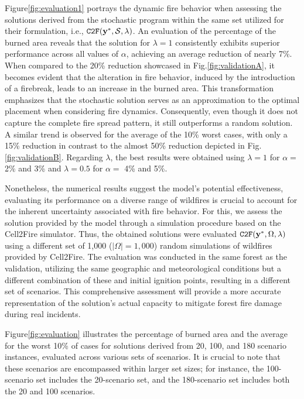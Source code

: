 \documentclass[a4paper,fleqn]{cas-sc}
\begin{document}
Figure\:\ref{fig:evaluation1} portrays the dynamic fire behavior when assessing the solutions derived from the stochastic program within the same set utilized for their formulation, i.e., $\texttt{C2F}(\vb{y}^*, \mathcal{S}, \lambda)$. An evaluation of the percentage of the burned area reveals that the solution for $\lambda = 1$ consistently exhibits superior performance across all values of $\alpha$, achieving an average reduction of nearly 7\%. When compared to the 20\% reduction showcased in Fig.\:\ref{fig:validationA}, it becomes evident that the alteration in fire behavior, induced by the introduction of a firebreak, leads to an increase in the burned area. This transformation emphasizes that the stochastic solution serves as an approximation to the optimal placement when considering fire dynamics. Consequently, even though it does not capture the complete fire spread pattern, it still outperforms a random solution. A similar trend is observed for the average of the 10\% worst cases, with only a 15\% reduction in contrast to the almost 50\% reduction depicted in Fig.\:\ref{fig:validationB}. Regarding $\lambda$, the best results were obtained using $\lambda = 1$ for $\alpha = $2\% and 3\% and $\lambda = 0.5$ for $\alpha =$ 4\% and 5\%.

Nonetheless, the numerical results suggest the model's potential effectiveness, evaluating its performance on a diverse range of wildfires is crucial to account for the inherent uncertainty associated with fire behavior. For this, we assess the solution provided by the model through a simulation procedure based on the Cell2Fire simulator. Thus, the obtained solutions were evaluated $\texttt{C2F}(\vb{y}^*, \Omega, \lambda)$ using a different set of 1,000 ($\vert \Omega \rvert = 1,000$) random simulations of wildfires provided by Cell2Fire. The evaluation was conducted in the same forest as the validation, utilizing the same geographic and meteorological conditions but a different combination of these and initial ignition points, resulting in a different set of scenarios. This comprehensive assessment will provide a more accurate representation of the solution's actual capacity to mitigate forest fire damage during real incidents.

Figure\:\ref{fig:evaluation} illustrates the percentage of burned area and the average for the worst 10\% of cases for solutions derived from 20, 100, and 180 scenario instances, evaluated across various sets of scenarios. It is crucial to note that these scenarios are encompassed within larger set sizes; for instance, the 100-scenario set includes the 20-scenario set, and the 180-scenario set includes both the 20 and 100 scenarios.
\end{document}
